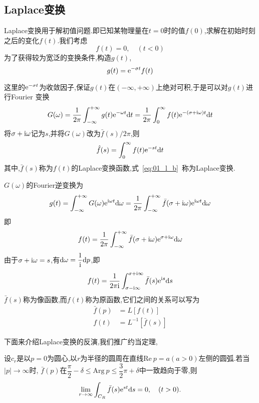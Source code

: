 \subsection{Laplace变换}
Laplace变换用于解初值问题.即已知某物理量在$t=0$时的值$f(0)$,求解在初始时刻之后的变化$f(t)$.我们考虑
\begin{equation}
 f(t)=0,\quad (t<0)
\end{equation}
为了获得较为宽泛的变换条件,构造$g(t)$,
\begin{equation}
 g(t)=\mathrm{e}^{-\sigma t}f(t)
\end{equation}\par
这里的$\mathrm{e}^{-\sigma t}$为收敛因子,保证$g(t)$在$(-\infty,+\infty)$上绝对可积,于是可以对$g(t)$进行Fourier
变换
\begin{equation*}
G(\omega)=\dfrac{1}{2\pi}\int_{-\infty}^{+\infty} g(t)\mathrm{e}^{-\omega t}\mathrm{d} t=
\dfrac{1}{2\pi}\int_{0}^{\infty}f(t)\mathrm{e}^{-(\sigma+\mathrm{i}\omega)t}\mathrm{d} t
\end{equation*}
将$\sigma+\mathrm{i}\omega$记为$s$,并将$G(\omega)$改为$\bar{f}(s)/2\pi$,则
\begin{equation}\label{eq:01_l_b}
 \hat{f}(s)=\int_{0}^{\infty}f(t)\mathrm{e}^{-st}\mathrm{d} t
\end{equation}
其中,$\bar{f}(s)$称为$f(t)$的Laplace变换函数,式~\ref{eq:01_l_b}~称为Laplace变换.\par
$G(\omega)$的Fourier逆变换为
\begin{equation*}
 g(t)=\int_{-\infty}^{+\infty}G(\omega)\mathrm{e}^{\mathrm{i}\omega t}\mathrm{d}\omega
     =\dfrac{1}{2\pi}\int_{-\infty}^{+\infty}\bar{f}(\sigma+\mathrm{i}\omega)\mathrm{e}^{\mathrm{i}\omega t}\mathrm{d}\omega
\end{equation*}
即
\begin{equation}
f(t)=\dfrac{1}{2\pi}\int_{-\infty}^{+\infty}\bar{f}(\sigma+\mathrm{i}\omega)\mathrm{e}^{\sigma+\mathrm{i}\omega}\mathrm{d}\omega
\end{equation}
由于$\sigma+\mathrm{i}\omega=s$,有$\mathrm{d}\omega=\dfrac{1}{\mathrm{i}}\mathrm{d} p$,即
\begin{equation}
 f(t)=\dfrac{1}{2\pi\mathrm{i}}\int_{\sigma-\mathrm{i}\infty}^{\sigma+\mathrm{i}\infty}\bar{f}(s)\mathrm{e}^{\mathrm{i} s}\mathrm{d} s
\end{equation}
$\bar{f}(s)$称为像函数,而$f(t)$称为原函数,它们之间的关系可以写为
\begin{align}
 \bar{f}(p)&=L[f(t)]  \\
 f(t)&=L^{-1}[\bar{f}(s)]
\end{align}\par
下面来介绍Laplace变换的反演,我们推广约当定理,
\begin{Theorem}[推广的约当定理]
 设$c_r$是以$p=0$为圆心,以$r$为半径的圆周在直线$\mathrm{Re}\ p=a(a>0)$左侧的圆弧.若当$|p|\to\infty$时,
 $\bar{f}(p)$在$\dfrac{\pi}{2}-\delta\leq \mathrm{Arg}\ p\leq\dfrac{3}{2}\pi+\delta$中一致趋向于零,则
 \begin{equation}\label{eq:01_l_yd}
  \lim_{r\to\infty}\int_{C_R}\bar{f}(s)\mathrm{e}^{st}\mathrm{d} s=0,\quad (t>0).
 \end{equation}
\end{Theorem}\par

